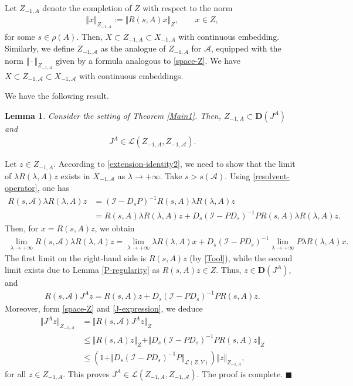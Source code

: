 \documentclass[onecolumn]{autart}
\def\la{\lambda}
\def\calL{{\mathcal{L}}}
\def\calA{{\mathcal{A}}}
\newtheorem{lemma}{Lemma}[section]
\numberwithin{equation}{section}
\newenvironment{proof}{{\it Proof: \enspace}}{\hfill $\blacksquare$\par}
\begin{document}
	
	Let $Z_{-1,A}$ denote the completion of $Z$ with respect to the norm
	\begin{align}\label{space-Z}
		\Vert x\Vert_{Z_{-1,A}}:=\Vert R(s,A)x\Vert_{Z},\qquad x\in Z,
	\end{align}
	for some $s\in \rho(A)$. Then, $X \subset Z_{-1,A} \subset X_{-1,A}$  with continuous embedding. Similarly, we define $Z_{-1,\calA}$ as the analogue of $Z_{-1,A}$ for $\calA$, equipped with the norm $\Vert \cdot\Vert_{Z_{-1,\calA}}$ given by a formula analogous to \eqref{space-Z}. We have $X \subset Z_{-1,\calA} \subset X_{-1,\calA}$ with continuous embeddings.
	
	We have the following result.
	\begin{lemma}\label{technical-lem1}
		Consider the setting of Theorem \ref{Main1}. Then, $Z_{-1,A}\subset {\bm D}(J^A)$ and
		\begin{align}\label{boundness-J}
			J^A\in \calL(Z_{-1,A},Z_{-1,\calA}).
		\end{align}
	\end{lemma}
	
	\begin{proof}
		Let $z\in Z_{-1,A}$. According to \eqref{extension-identity2}, we need to show that the limit of $\la R(\la,A)z$ exists in $X_{-1,\calA}$ as $\la \to +\infty$. Take $ s>s(\calA)$. Using \eqref{resolvent-operator}, one has
		\begin{align*}
			R(s,\calA)\la R(\la,A)z&=(\mathcal{I}-D_s P)^{-1}R(s,A)\la R(\la,A)z\\
			&=R(s,A)\la R(\la,A)z+D_s (\mathcal{I}-P D_s )^{-1}P R(s,A)\la R(\la,A)z.
		\end{align*}
		Then, for $x=R(s,A)z$, we obtain
		\begin{align*}
			\lim_{\la \to +\infty}R(s,\calA)\la R(\la,A)z=\lim_{\la \to +\infty} \la R(\la,A)x
			+D_s (\mathcal{I}-P D_s )^{-1}\lim_{\la \to +\infty} P \la R(\la,A) x.
		\end{align*}
		The first limit on the right-hand side is $R(s,A)z$ (by \eqref{Tool}), while the second limit exists due to Lemma \ref{P-regularity} as $R(s,A)z\in Z$. Thus, $z\in {\bm D}(J^A)$, and
		\begin{align}\label{J-expression}
			R(s, \calA)J^Az=R(s,A)z+D_s (\mathcal{I}-P D_s )^{-1}P R(s,A)z.
		\end{align}
		Moreover, form \eqref{space-Z} and \eqref{J-expression}, we deduce
		\begin{align*}
			\Vert J^Az\Vert_{Z_{-1,\calA}}&=\Vert R(s, \calA)J^Az\Vert_{Z}\\
			&\le \Vert R(s,A)z\Vert_{Z}+ \Vert D_s (\mathcal{I}-P D_s )^{-1}P R(s,A)z\Vert_{Z}\\
			&\le \left(1+\Vert D_s(\mathcal{I}-P D_s )^{-1}P\Vert_{\calL(Z,Y)}\right)\Vert z\Vert_{Z_{-1,A}},
		\end{align*}
		for all $z\in Z_{-1,A}$. This proves $J^A\in \calL(Z_{-1,A},Z_{-1,\calA})$. The proof is complete.
	\end{proof}
	
\end{document}
